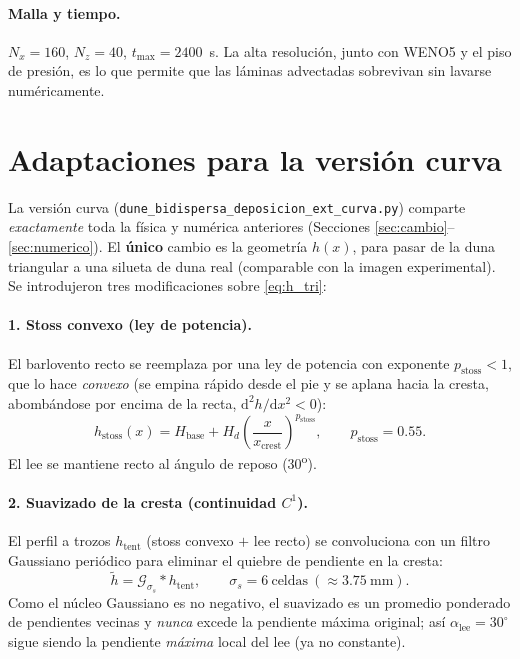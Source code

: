 \documentclass[11pt,a4paper]{article}
\newcommand{\dd}{\mathrm{d}}
\begin{document}
\paragraph{Malla y tiempo.} $N_x=160$, $N_z=40$, $t_{\max}=2400$~s. La
alta resolución, junto con WENO5 y el piso de presión, es lo que permite
que las láminas advectadas sobrevivan sin lavarse numéricamente.

\section{Adaptaciones para la versión curva}
\label{sec:curva}
La versión curva (\texttt{dune\_bidispersa\_deposicion\_ext\_curva.py})
comparte \emph{exactamente} toda la física y numérica anteriores
(Secciones \ref{sec:cambio}--\ref{sec:numerico}). El \textbf{único} cambio
es la geometría $h(x)$, para pasar de la duna triangular a una silueta de
duna real (comparable con la imagen experimental). Se introdujeron tres
modificaciones sobre \eqref{eq:h_tri}:

\paragraph{1. Stoss convexo (ley de potencia).} El barlovento recto se
reemplaza por una ley de potencia con exponente $p_{\mathrm{stoss}}<1$, que
lo hace \emph{convexo} (se empina rápido desde el pie y se aplana hacia la
cresta, abombándose por encima de la recta, $\dd^2h/\dd x^2<0$):
\begin{equation}
    h_{\mathrm{stoss}}(x) = H_{\mathrm{base}} + H_d\left(\frac{x}{x_{\mathrm{crest}}}\right)^{p_{\mathrm{stoss}}},
    \qquad p_{\mathrm{stoss}} = 0.55 .
\end{equation}
El lee se mantiene recto al ángulo de reposo (30\textsuperscript{o}).

\paragraph{2. Suavizado de la cresta (continuidad $C^1$).} El perfil a
trozos $h_{\mathrm{tent}}$ (stoss convexo $+$ lee recto) se convoluciona
con un filtro Gaussiano periódico para eliminar el quiebre de pendiente en
la cresta:
\begin{equation}
    \tilde h = \mathcal{G}_{\sigma_s} \ast h_{\mathrm{tent}},
    \qquad \sigma_s = 6~\text{celdas} \ (\approx 3.75~\text{mm}).
\end{equation}
Como el núcleo Gaussiano es no negativo, el suavizado es un promedio
ponderado de pendientes vecinas y \emph{nunca} excede la pendiente máxima
original; así $\alpha_{\mathrm{lee}}=30^\circ$ sigue siendo la pendiente
\emph{máxima} local del lee (ya no constante).
\end{document}
